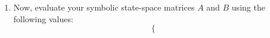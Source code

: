 \documentclass[12pt]{report}
\begin{document}
\begin{enumerate}
{\begin{align*}
\begin{array}{c}
                          \dot{\alpha}(t)  \\
                          \ddot{\theta}(t) \\
                          \ddot{\alpha}(t)
                      \end{array}\right] = \frac{1}{J_T}
                  \left[\begin{array}{c c c c}
                          0 & 0                                                    & 1                                              & 0                                  \\
                          0 & 0                                                    & 0                                              & 1                                  \\
                          0 & \frac{1}{4} m_{p}^2 L_{p}^2 L_r g                    & -\left(J_p + \frac{1}{4} m_p L_{p}^2\right)B_r & -\frac{1}{2} m_p L_p L_r B_p       \\
                          0 & \frac{1}{2} m_p L_p g \left(J_r + m_p L_{r}^2\right) & -\frac{1}{2} m_p L_p L_r B_r                   & -\left(J_r + m_p L_{r}^2\right)B_p
                      \end{array}\right]
                  \left[\begin{array}{c}
                          \theta(t)       \\
                          \alpha(t)       \\
                          \dot{\theta}(t) \\
                          \dot{\alpha}(t)
                      \end{array}\right]                    \\
                   & + \frac{1}{J_T}
                  \left[\begin{array}{c}
                          0                             \\
                          0                             \\
                          J_p + \frac{1}{4} m_p L_{p}^2 \\
                          \frac{1}{2} m_p L_p L_r
                      \end{array}\right] \tau
              \end{align*}}
    \item Now, evaluate your symbolic state-space matrices $A$ and $B$ using the following values:
          \[
              \begin{cases}

\end{cases}\]
\end{enumerate}
\end{document}
